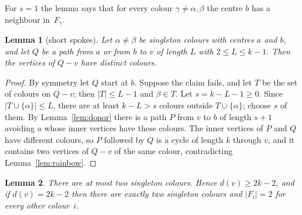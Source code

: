 \documentclass[11pt]{article}
\newtheorem{lemma}{Lemma}
\theoremstyle{remark}
\begin{document}
\noindent For $s=1$ the lemma says that for every colour $\gamma\ne\alpha,\beta$
the centre $b$ has a neighbour in~$F_\gamma$.

\begin{lemma}[short spokes]\label{lem:spoke}
Let $\alpha\ne\beta$ be singleton colours with centres $a$ and $b$, and let $Q$
be a path from $a$ or from $b$ to $v$ of length $L$ with $2\le L\le k-1$. Then
the vertices of $Q-v$ have distinct colours.
\end{lemma}

\begin{proof}
By symmetry let $Q$ start at $b$. Suppose the claim fails, and let $T$ be the set of colours on $Q-v$; then $|T|\le L-1$ and
$\beta\in T$. Let $s=k-L-1\ge0$. Since $|T\cup\{\alpha\}|\le L$, there are at
least $k-L>s$ colours outside $T\cup\{\alpha\}$; choose $s$ of them. By
Lemma~\ref{lem:donor} there is a path $P$ from $v$ to $b$ of length $s+1$
avoiding $a$ whose inner vertices have these colours. The inner vertices of
$P$ and $Q$ have different colours, so $P$ followed by $Q$ is a cycle of length
$k$ through $v$, and it contains two vertices of $Q-v$ of the same colour,
contradicting Lemma~\ref{lem:rainbow}.
\end{proof}

\begin{lemma}\label{lem:twosingletons}
There are at most two singleton colours. Hence $d(v)\ge 2k-2$, and if
$d(v)=2k-2$ then there are exactly two singleton colours and $|F_i|=2$ for
every other colour~$i$.
\end{lemma}
\end{document}
